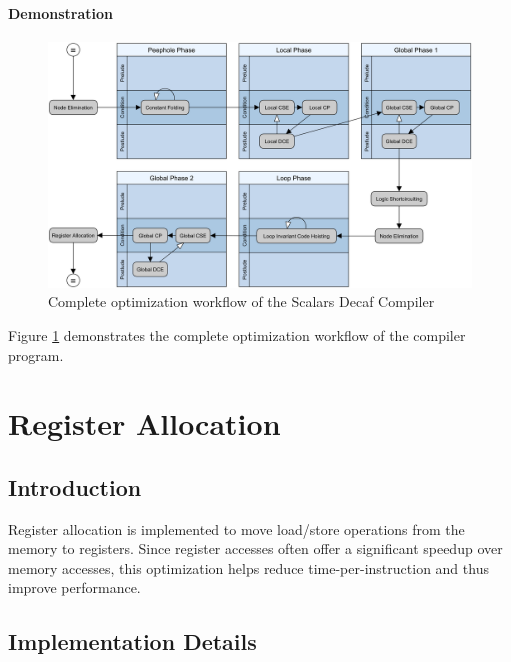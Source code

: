 \paragraph{Demonstration}

\begin{figure}[ht]
    \centering
    \includegraphics[width=\textwidth]{img/optimization-scheduling}
    \caption{Complete optimization workflow of the Scalars Decaf Compiler}
    \label{fig:optimization-scheduling}
\end{figure}

Figure \ref{fig:optimization-scheduling} demonstrates the complete optimization workflow of the compiler program.

\section{Register Allocation}

\subsection{Introduction}

Register allocation is implemented to move load/store operations from the memory to registers. Since register accesses often offer a significant speedup over memory accesses, this optimization helps reduce time-per-instruction and thus improve performance.

\subsection{Implementation Details}

